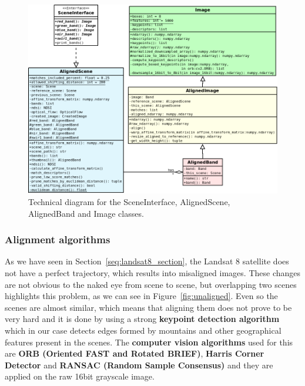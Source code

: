 \documentclass[12pt, a4paper]{report}
\begin{document}
	\begin{figure}[h!]
		\centering
		\includegraphics[scale=0.45]{../images/alignment_diagram.png}
		\caption{Technical diagram for the SceneInterface, AlignedScene, AlignedBand and Image classes.}
		\label{fig:alignment_diagram}
	\end{figure}

	\subsubsection{Alignment algorithms}
	\label{seq:alignment_algorithm}
	
	\par As we have seen in Section~\ref{seq:landsat8_section}, the Landsat 8 satellite does not have a perfect trajectory, which results into misaligned images. These changes are not obvious to the naked eye from scene to scene, but overlapping two scenes highlights this problem, as we can see in Figure~\ref{fig:unaligned}. Even so the scenes are almost similar, which means that aligning them does not prove to be very hard and it is done by using a strong \textbf{keypoint detection algorithm} which in our case detects edges formed by mountains and other geographical features present in the scenes. The \textbf{computer vision algorithms} used for this are \textbf{ORB (Oriented FAST and Rotated BRIEF)}, \textbf{Harris Corner Detector} and \textbf{RANSAC (Random Sample Consensus)} and they are applied on the raw 16bit grayscale image.
	
\end{document}
